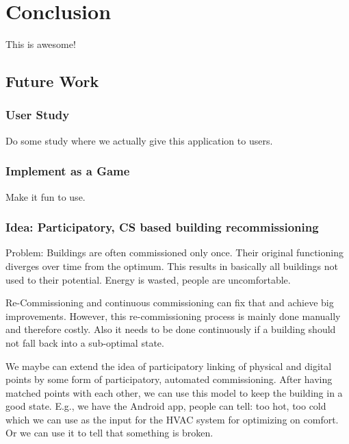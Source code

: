 \section{Conclusion}  %
\label{sec:conclusion}

This is awesome!


\subsection{Future Work} %
\label{sub:future_work}

\subsubsection{User Study} %
\label{ssub:user_study}
Do some study where we actually give this application to users.

\subsubsection{Implement as a Game} %
\label{ssub:implement_as_a_game}
Make it fun to use.

\subsubsection{Idea: Participatory, CS based building recommissioning} %
\label{ssub:idea_participatory_cs_based_building_recommissioning}

Problem:
Buildings are often commissioned only once. Their original functioning diverges over time from the optimum.
This results in basically all buildings not used to their potential. Energy is wasted, people are uncomfortable.

Re-Commissioning and continuous commissioning can fix that and achieve big improvements.
However, this re-commissioning process is mainly done manually and therefore costly.
Also it needs to be done continuously if a building should not fall back into a sub-optimal state.

We maybe can extend the idea of participatory linking of physical and digital points by some form of participatory, automated commissioning.
After having matched points with each other,  we can use this model to keep the building in a good state.
E.g., we have the Android app, people can tell: too hot, too cold which we can use as the input for the HVAC system for optimizing on comfort.
Or we can use it to tell that something is broken.



